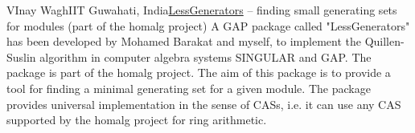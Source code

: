 \documentclass[12pt,a4paper]{article}
\begin{document}
\begin{Abstract}{VInay Wagh}{IIT Guwahati, India}{\href{https://github.com/homalg-project/LessGenerators}{LessGenerators} -- finding small generating sets for modules (part of the homalg project)}
A GAP package called "LessGenerators" has been developed by Mohamed
Barakat and myself, to implement the Quillen-Suslin algorithm in
computer algebra systems SINGULAR and GAP. The package is part of the
homalg project. The aim of this package is to provide a tool for finding
a minimal generating set for a given module. The package provides
universal implementation in the sense of CASs, i.e. it can use any CAS
supported by the homalg project for ring arithmetic.
\end{Abstract}
\end{document}
